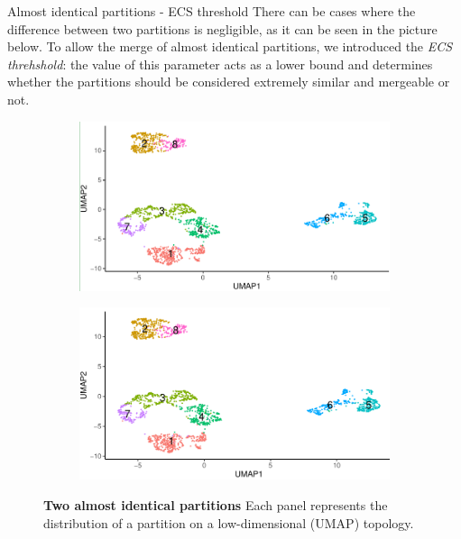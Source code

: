 \begin{frame}{Almost identical partitions - ECS threshold}
    There can be cases where the difference between two partitions is negligible, as it can be seen in the picture below.
    To allow the merge of almost identical partitions, we introduced the \textit{ECS threhshold}: the value of this parameter acts as a lower bound and determines whether the partitions should be considered extremely similar and mergeable or not.
    \begin{figure}
        \centering
        \begin{subfigure}[t]{0.47\textwidth}
            \includegraphics[width=\textwidth]{images/ch2/2_almost_s.png}
        \end{subfigure}
        \begin{subfigure}[b]{0.47\textwidth}
            \includegraphics[width=\textwidth]{images/ch2/2_almost_m.png}
        \end{subfigure}
        \caption{\textbf{Two almost identical partitions} Each panel represents the distribution of a partition on a low-dimensional (UMAP) topology.}
    \end{figure}
\end{frame}

